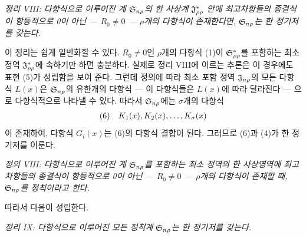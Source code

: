 \emph{정리 VIII: 다항식으로 이루어진 계 $\mathfrak S_{n\rho}$의 한 사상계 $\mathfrak J^*_{\rho\rho}$ 안에 최고차항들의 종결식이 항등적으로 0이 아닌 --- $R_0\ne0$ --- $\rho$개의 다항식이 존재한다면, $\mathfrak S_{n\rho}$는 한 정기저를 갖는다.}

이 정리는 쉽게 일반화할 수 있다. $R_0\ne0$인 $\rho$개의 다항식 (1)이 $\mathfrak S^*_{\rho\rho}$를 포함하는 최소 정역 $\mathfrak J^*_{\rho\rho}$에 속하기만 하면 충분하다. 실제로 정리 VIII에 이르는 추론은 이 경우에도 표현 (5)가 성립함을 보여 준다. 그런데 정의에 따라 최소 포함 정역 $\mathfrak J_{n\rho}$의 모든 다항식 $L(x)$은 $\mathfrak S_{n\rho}$의 유한개의 다항식 --- 이 다항식들은 $L(x)$에 따라 달라진다 --- 으로 다항식적으로 나타낼 수 있다. 따라서 $\mathfrak S_{n\rho}$에는 $\sigma$개의 다항식
\[
\begin{array}{@{}l@{\quad}c@{}}
(6)& K_1(x),K_2(x),\ldots,K_\sigma(x)
\end{array}
\]
이 존재하여, 다항식 $G_i(x)$는 (6)의 다항식 결합이 된다. 그러므로 (6)과 (4)가 한 정기저를 이룬다.

\emph{정의 VIII: 다항식으로 이루어진 계 $\mathfrak S_{n\rho}$를 포함하는 최소 정역의 한 사상영역에 최고차항들의 종결식이 항등적으로 0이 아닌 --- $R_0\ne0$ --- $\rho$개의 다항식이 존재할 때, $\mathfrak S_{n\rho}$를 정칙이라고 한다.}

따라서 다음이 성립한다.

\emph{정리 IX: 다항식으로 이루어진 모든 정칙계 $\mathfrak S_{n\rho}$는 한 정기저를 갖는다.}

